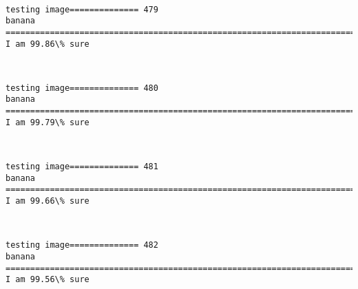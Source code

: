 \documentclass[11pt]{article}
\begin{document}
    \begin{center}
    \end{center}
    { \hspace*{\fill} \\}
    
    \begin{Verbatim}[commandchars=\\\{\}]
testing image============== 479
banana
============================================================================
I am 99.86\% sure

    \end{Verbatim}

    \begin{center}
    \end{center}
    { \hspace*{\fill} \\}
    
    \begin{Verbatim}[commandchars=\\\{\}]
testing image============== 480
banana
============================================================================
I am 99.79\% sure

    \end{Verbatim}

    \begin{center}
    \end{center}
    { \hspace*{\fill} \\}
    
    \begin{Verbatim}[commandchars=\\\{\}]
testing image============== 481
banana
============================================================================
I am 99.66\% sure

    \end{Verbatim}

    \begin{center}
    \end{center}
    { \hspace*{\fill} \\}
    
    \begin{Verbatim}[commandchars=\\\{\}]
testing image============== 482
banana
============================================================================
I am 99.56\% sure

    \end{Verbatim}
\end{document}
